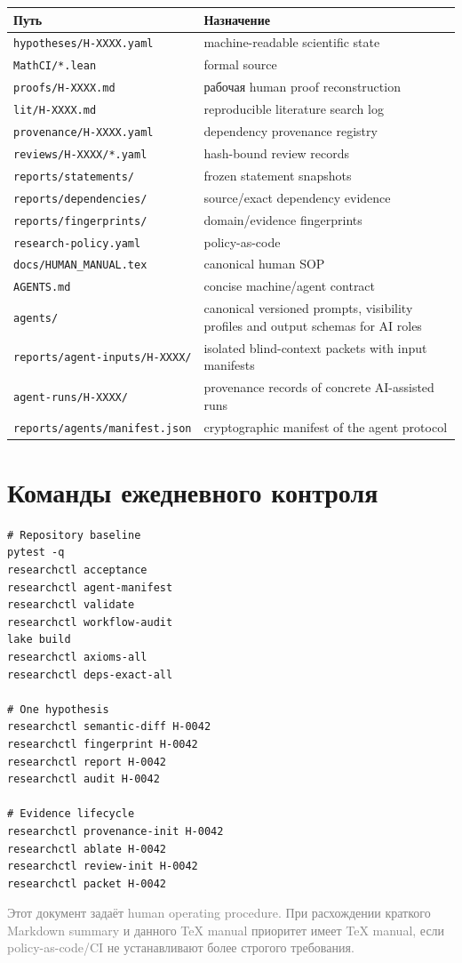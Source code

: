 \documentclass[11pt,a4paper]{article}
\begin{document}
\begin{tabularx}{\textwidth}{@{}p{}Y@{}}
\toprule
Путь & Назначение \\
\midrule
\texttt{hypotheses/H-XXXX.yaml} & machine-readable scientific state \\
\texttt{MathCI/*.lean} & formal source \\
\texttt{proofs/H-XXXX.md} & рабочая human proof reconstruction \\
\texttt{lit/H-XXXX.md} & reproducible literature search log \\
\texttt{provenance/H-XXXX.yaml} & dependency provenance registry \\
\texttt{reviews/H-XXXX/*.yaml} & hash-bound review records \\
\texttt{reports/statements/} & frozen statement snapshots \\
\texttt{reports/dependencies/} & source/exact dependency evidence \\
\texttt{reports/fingerprints/} & domain/evidence fingerprints \\
\texttt{research-policy.yaml} & policy-as-code \\
\texttt{docs/HUMAN\_MANUAL.tex} & canonical human SOP \\
\texttt{AGENTS.md} & concise machine/agent contract \\
\texttt{agents/} & canonical versioned prompts, visibility profiles and output schemas for AI roles \\
\texttt{reports/agent-inputs/H-XXXX/} & isolated blind-context packets with input manifests \\
\texttt{agent-runs/H-XXXX/} & provenance records of concrete AI-assisted runs \\
\texttt{reports/agents/manifest.json} & cryptographic manifest of the agent protocol \\
\bottomrule
\end{tabularx}

\section{Команды ежедневного контроля}

\begin{lstlisting}
# Repository baseline
pytest -q
researchctl acceptance
researchctl agent-manifest
researchctl validate
researchctl workflow-audit
lake build
researchctl axioms-all
researchctl deps-exact-all

# One hypothesis
researchctl semantic-diff H-0042
researchctl fingerprint H-0042
researchctl report H-0042
researchctl audit H-0042

# Evidence lifecycle
researchctl provenance-init H-0042
researchctl ablate H-0042
researchctl review-init H-0042
researchctl packet H-0042
\end{lstlisting}

\vfill
\begin{center}
\small\textcolor{gray}{Этот документ задаёт human operating procedure. При расхождении краткого Markdown summary и данного TeX manual приоритет имеет TeX manual, если policy-as-code/CI не устанавливают более строгого требования.}
\end{center}
\end{document}
